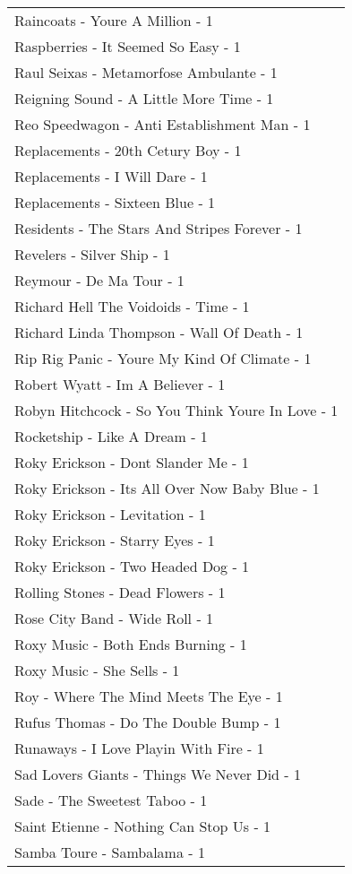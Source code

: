 \documentclass[
]{article}
\begin{document}
\begin{longtable}{l}
Raincoats - Youre A Million - 1 \\ 
Raspberries - It Seemed So Easy - 1 \\ 
Raul Seixas - Metamorfose Ambulante - 1 \\ 
Reigning Sound - A Little More Time - 1 \\ 
Reo Speedwagon - Anti Establishment Man - 1 \\ 
Replacements - 20th Cetury Boy - 1 \\ 
Replacements - I Will Dare - 1 \\ 
Replacements - Sixteen Blue - 1 \\ 
Residents - The Stars And Stripes Forever - 1 \\ 
Revelers - Silver Ship - 1 \\ 
Reymour - De Ma Tour - 1 \\ 
Richard Hell The Voidoids - Time - 1 \\ 
Richard Linda Thompson - Wall Of Death - 1 \\ 
Rip Rig Panic - Youre My Kind Of Climate - 1 \\ 
Robert Wyatt - Im A Believer - 1 \\ 
Robyn Hitchcock - So You Think Youre In Love - 1 \\ 
Rocketship - Like A Dream - 1 \\ 
Roky Erickson - Dont Slander Me - 1 \\ 
Roky Erickson - Its All Over Now Baby Blue - 1 \\ 
Roky Erickson - Levitation - 1 \\ 
Roky Erickson - Starry Eyes - 1 \\ 
Roky Erickson - Two Headed Dog - 1 \\ 
Rolling Stones - Dead Flowers - 1 \\ 
Rose City Band - Wide Roll - 1 \\ 
Roxy Music - Both Ends Burning - 1 \\ 
Roxy Music - She Sells - 1 \\ 
Roy - Where The Mind Meets The Eye - 1 \\ 
Rufus Thomas - Do The Double Bump - 1 \\ 
Runaways - I Love Playin With Fire - 1 \\ 
Sad Lovers Giants - Things We Never Did - 1 \\ 
Sade - The Sweetest Taboo - 1 \\ 
Saint Etienne - Nothing Can Stop Us - 1 \\ 
Samba Toure - Sambalama - 1 \\ 

\end{longtable}
\end{document}
